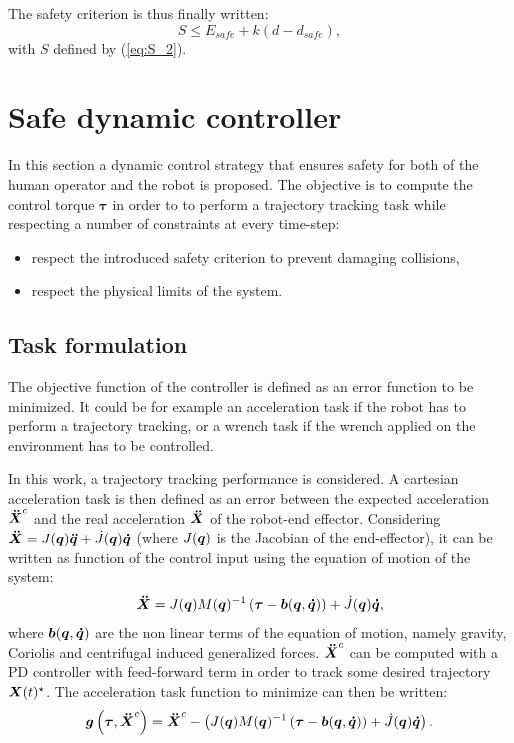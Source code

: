 \documentclass[a4paper, 10pt, conference]{ieeeconf}      %
\newcommand{\vect}[1]{\mbox{\boldmath${#1}$}}%
\begin{document}
The safety criterion is thus finally written: 
\begin{equation}
S \leq E_{safe} +  k (d - d_{safe}),
\end{equation}
with $S$ defined by (\ref{eq:S_2}).

\section{Safe dynamic controller}
In this section a dynamic control strategy that ensures safety for both of the human operator and the robot is proposed. The objective is to compute the control torque $\boldsymbol{\tau}$ in order to to perform a trajectory tracking task while respecting a number of constraints at every time-step: 
\begin{itemize}
\item respect the introduced safety criterion to prevent damaging collisions,
\item respect the physical limits of the system.
\end{itemize}

\subsection{Task formulation}
The objective function of the controller is defined as an error function to be minimized. It could be for example an acceleration task if the
robot has to perform a trajectory tracking, or a wrench task if the wrench applied on the environment has to be controlled.

In this work, a trajectory tracking performance is considered. A cartesian acceleration task is then defined as an error between the expected acceleration $\vect{\ddot{X}}^c$ and the real acceleration $\vect{\ddot{X}}$ of the robot-end effector. Considering $\vect{\ddot{X}} =  J(\vect{q}) \vect{\ddot{q}} + \dot{J}(\vect{q}) \vect{\dot{q}}$ (where $J(\vect{q})$ is the Jacobian of the end-effector), it can be written as function of the control input using the equation of motion of the system:
\begin{equation}
 \vect{\ddot{X}} = J(\vect{q}) M(\vect{q})^{-1} \left(\boldsymbol{\tau} - \vect{b}(\vect{q},\vect{\dot{q}})\right) + \dot{J}(\vect{q}) \vect{\dot{q}},
\label{Xddot}
\end{equation}
where $\vect{b}(\vect{q},\vect{\dot{q}})$ are the non linear terms of the equation of motion, namely gravity, Coriolis and centrifugal induced generalized forces. $\vect{\ddot{X}}^c$ can be computed with a PD controller with feed-forward term in order to track some desired trajectory $\vect{X}(t)^\star$. The acceleration task function to minimize can then be written:
\begin{equation}
 \vect{g}\left(\boldsymbol{\tau},\vect{\ddot{X}}^c\right) =  \vect{\ddot{X}}^c - \left(J(\vect{q}) M(\vect{q})^{-1} \left(\boldsymbol{\tau} - \vect{b}(\vect{q},\vect{\dot{q}}) \right) + \dot{J}(\vect{q}) \vect{\dot{q}}\right) .
\label{accelerationError}
\end{equation}
\end{document}
